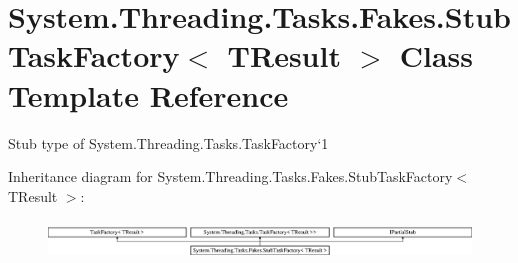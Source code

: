 \hypertarget{class_system_1_1_threading_1_1_tasks_1_1_fakes_1_1_stub_task_factory_3_01_t_result_01_4}{\section{System.\-Threading.\-Tasks.\-Fakes.\-Stub\-Task\-Factory$<$ T\-Result $>$ Class Template Reference}
\label{class_system_1_1_threading_1_1_tasks_1_1_fakes_1_1_stub_task_factory_3_01_t_result_01_4}
}


Stub type of System.\-Threading.\-Tasks.\-Task\-Factory`1 


Inheritance diagram for System.\-Threading.\-Tasks.\-Fakes.\-Stub\-Task\-Factory$<$ T\-Result $>$\-:\begin{figure}[H]
\begin{center}
\leavevmode
\includegraphics[height=1.039926cm]{class_system_1_1_threading_1_1_tasks_1_1_fakes_1_1_stub_task_factory_3_01_t_result_01_4}
\end{center}
\end{figure}
